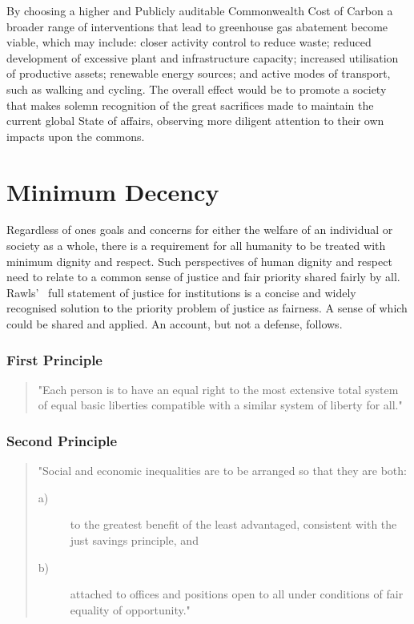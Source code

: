 \documentclass[11pt, oneside]{book}   	%
\begin{document}
By choosing a higher and Publicly auditable Commonwealth Cost of Carbon a broader range of interventions that lead to greenhouse gas abatement become viable, which may include: closer activity control to reduce waste; reduced development of excessive plant and infrastructure capacity; increased utilisation of productive assets; renewable energy sources; and active modes of transport, such as walking and cycling.
The overall effect would be to promote a society that makes solemn recognition of the great sacrifices made to maintain the current global State of affairs, observing more diligent attention to their own impacts upon the commons.\

\section{Minimum Decency}
Regardless of ones goals and concerns for either the welfare of an individual or society as a whole, there is a requirement for all humanity to be treated with minimum dignity and respect.
Such perspectives of human dignity and respect need to relate to a common sense of justice and fair priority shared fairly by all.
Rawls'~\cite{jr1} full statement of justice for institutions is a concise and widely recognised solution to the priority problem of justice as fairness.
A sense of which could be shared and applied.
An account, but not a defense, follows.

\subsubsection{First Principle}

\begin{quote}
"Each person is to have an equal right to the most extensive total system of equal basic liberties compatible with a similar system of liberty for all."
\end{quote}

\subsubsection{Second Principle}

\begin{quote}
"Social and economic inequalities are to be arranged so that they are both:
\begin{description}
\item[ a)] to the greatest benefit of the least advantaged, consistent with the just savings principle, and
\item[ b)] attached to offices and positions open to all under conditions of fair equality of opportunity."
\end{description}
\end{quote}
\end{document}

